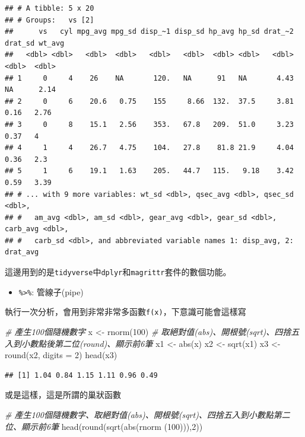 \documentclass[
]{book}
\newenvironment{Shaded}{\begin{snugshade}}{\end{snugshade}}
\newcommand{\AttributeTok}[1]{\textcolor[rgb]{0.77,0.63,0.00}{#1}}
\newcommand{\CommentTok}[1]{\textcolor[rgb]{0.56,0.35,0.01}{\textit{#1}}}
\newcommand{\DecValTok}[1]{\textcolor[rgb]{0.00,0.00,0.81}{#1}}
\newcommand{\FunctionTok}[1]{\textcolor[rgb]{0.00,0.00,0.00}{#1}}
\newcommand{\NormalTok}[1]{#1}
\newcommand{\OtherTok}[1]{\textcolor[rgb]{0.56,0.35,0.01}{#1}}
\providecommand{\tightlist}{%
  \setlength{\itemsep}{0pt}\setlength{\parskip}{0pt}}
\begin{document}
\begin{verbatim}
## # A tibble: 5 x 20
## # Groups:   vs [2]
##      vs   cyl mpg_avg mpg_sd disp_~1 disp_sd hp_avg hp_sd drat_~2 drat_sd wt_avg
##   <dbl> <dbl>   <dbl>  <dbl>   <dbl>   <dbl>  <dbl> <dbl>   <dbl>   <dbl>  <dbl>
## 1     0     4    26    NA       120.   NA      91   NA       4.43   NA      2.14
## 2     0     6    20.6   0.75    155     8.66  132.  37.5     3.81    0.16   2.76
## 3     0     8    15.1   2.56    353.   67.8   209.  51.0     3.23    0.37   4   
## 4     1     4    26.7   4.75    104.   27.8    81.8 21.9     4.04    0.36   2.3 
## 5     1     6    19.1   1.63    205.   44.7   115.   9.18    3.42    0.59   3.39
## # ... with 9 more variables: wt_sd <dbl>, qsec_avg <dbl>, qsec_sd <dbl>,
## #   am_avg <dbl>, am_sd <dbl>, gear_avg <dbl>, gear_sd <dbl>, carb_avg <dbl>,
## #   carb_sd <dbl>, and abbreviated variable names 1: disp_avg, 2: drat_avg
\end{verbatim}

這邊用到的是\texttt{tidyverse}中\texttt{dplyr}和\texttt{magrittr}套件的數個功能。

\begin{itemize}
\tightlist
\item
  \texttt{\%\textgreater{}\%}: 管線子(pipe)
\end{itemize}

執行一次分析，會用到非常非常多函數\texttt{f(x)}，下意識可能會這樣寫

\begin{Shaded}
\begin{Highlighting}[]
\CommentTok{\# 產生100個隨機數字}
\NormalTok{x }\OtherTok{\textless{}{-}} \FunctionTok{rnorm}\NormalTok{(}\DecValTok{100}\NormalTok{)}
\CommentTok{\# 取絕對值(abs)、開根號(sqrt)、四捨五入到小數點後第二位(round)、顯示前6筆}
\NormalTok{x1 }\OtherTok{\textless{}{-}} \FunctionTok{abs}\NormalTok{(x)}
\NormalTok{x2 }\OtherTok{\textless{}{-}} \FunctionTok{sqrt}\NormalTok{(x1)}
\NormalTok{x3 }\OtherTok{\textless{}{-}} \FunctionTok{round}\NormalTok{(x2, }\AttributeTok{digits =} \DecValTok{2}\NormalTok{)}
\FunctionTok{head}\NormalTok{(x3)}
\end{Highlighting}
\end{Shaded}

\begin{verbatim}
## [1] 1.04 0.84 1.15 1.11 0.96 0.49
\end{verbatim}

或是這樣，這是所謂的巢狀函數

\begin{Shaded}
\begin{Highlighting}[]
\CommentTok{\# 產生100個隨機數字、取絕對值(abs)、開根號(sqrt)、四捨五入到小數點第二位、顯示前6筆}
\FunctionTok{head}\NormalTok{(}\FunctionTok{round}\NormalTok{(}\FunctionTok{sqrt}\NormalTok{(}\FunctionTok{abs}\NormalTok{(}\FunctionTok{rnorm}\NormalTok{ (}\DecValTok{100}\NormalTok{))),}\DecValTok{2}\NormalTok{))}
\end{Highlighting}
\end{Shaded}
\end{document}
